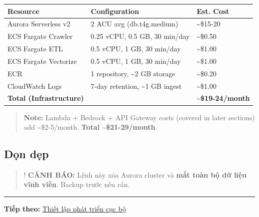 \begingroup
\small
\setlength{\tabcolsep}{3pt}
\renewcommand{\arraystretch}{1.15}
\begin{longtable}[]{@{}lll@{}}
\toprule\noalign{}
Resource & Configuration & Est. Cost \\
\midrule\noalign{}
\endhead
\bottomrule\noalign{}
\endlastfoot
Aurora Serverless v2 & 2 ACU avg (db.t4g.medium) &
\textasciitilde\$15-20 \\
ECS Fargate Crawler & 0.25 vCPU, 0.5 GB, 30 min/day &
\textasciitilde\$0.50 \\
ECS Fargate ETL & 0.5 vCPU, 1 GB, 30 min/day & \textasciitilde\$1.00 \\
ECS Fargate Vectorize & 0.5 vCPU, 1 GB, 30 min/day &
\textasciitilde\$1.00 \\
ECR & 1 repository, \textasciitilde2 GB storage &
\textasciitilde\$0.20 \\
CloudWatch Logs & 7-day retention, \textasciitilde1 GB ingest &
\textasciitilde\$1.00 \\
\textbf{Total (Infrastructure)} & &
\textbf{\textasciitilde\$19-24/month} \\
\end{longtable}
\endgroup

\begin{quote}
\textbf{Note:} Lambda + Bedrock + API Gateway costs (covered in later
sections) add \textasciitilde\$2-5/month. \textbf{Total
\textasciitilde\$21-29/month}.
\end{quote}

\hypertarget{dux1ecdn-dux1eb9p}{%
\subsection{Dọn dẹp}}

\begin{Shaded}
\begin{Highlighting}[]
\end{Highlighting}
\end{Shaded}

\begin{quote}
! \textbf{CẢNH BÁO:} Lệnh này xóa Aurora cluster và \textbf{mất toàn bộ
dữ liệu vĩnh viễn}. Backup trước nếu cần.
\end{quote}

\begin{center}\rule{0.5\linewidth}{0.5pt}\end{center}

\textbf{Tiếp theo:} \href{5.4-Local-Dev/}{Thiết lập phát triển cục bộ}
